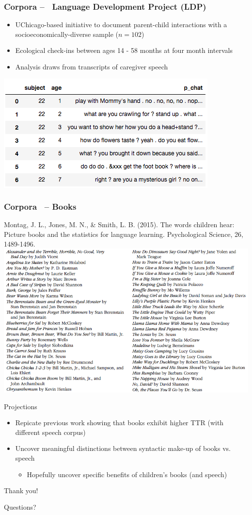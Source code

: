 \documentclass{beamer}
\begin{document}
\begin{frame}
	\frametitle{Corpora --  Language Development Project (LDP)}
	\begin{itemize}
		\item UChicago-based initiative to document parent-child interactions with a socioeconomically-diverse sample ($n=102$)
		\item Ecological check-ins between ages 14 - 58 months at four month intervals
		\item Analysis draws from transcripts of caregiver speech
	\end{itemize}
	\begin{center}
		\includegraphics[width=.6\linewidth]{ldp_excerpt.png}
	\end{center}

\end{frame}



\begin{frame}
	\frametitle{Corpora  -- Books}
	\footnotesize{Montag, J. L., Jones, M. N., \& Smith, L. B. (2015). The words children hear: Picture books and the statistics for language learning. Psychological Science, 26, 1489-1496.} 
	\vspace{5mm}
	\includegraphics[width=.9\linewidth]{kidbooks.png}
\end{frame}

\begin{frame}{Projections}
	\begin{itemize}
		\item Repicate previous work showing that books exhibit higher TTR (with different speech corpus)
		\item Uncover meaningful distinctions between syntactic make-up of books vs. speech
		\begin{itemize}
			\item Hopefully uncover specific benefits of children's books (and speech)
		\end{itemize}
	\end{itemize}

	
\end{frame}

\begin{frame}{Thank you!}
	\begin{center}
		\Huge Questions?
	\end{center}
\end{frame}
	
	
\end{document}
